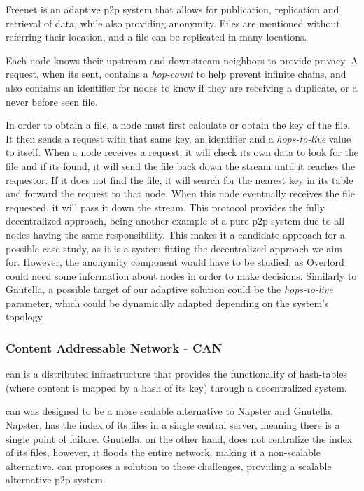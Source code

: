Freenet \cite{Clarke2001} is an adaptive \gls{p2p} system that allows for publication, replication and retrieval of data, while also providing anonymity. Files are mentioned without referring their location, and a file can be replicated in many locations.

Each node knows their upstream and downstream neighbors to provide privacy. A request, when its sent, contains a \textit{hop-count} to help prevent infinite chains, and also contains an identifier for nodes to know if they are receiving a duplicate, or a never before seen file.

In order to obtain a file, a node must first calculate or obtain the key of the file. It then sends a request with that same key, an identifier and a \textit{hops-to-live} value to itself. When a node receives a request, it will check its own data to look for the file and if its found, it will send the file back down the stream until it reaches the requestor. If it does not find the file, it will search for the nearest key in its table and forward the request to that node. When this node eventually receives the file requested, it will pass it down the stream. This protocol provides the fully decentralized approach, being another example of a pure \gls{p2p} system due to all nodes having the same responsibility. This makes it a candidate approach for a possible case study, as it is a system fitting the decentralized approach we aim for. However, the anonymity component would have to be studied, as Overlord could need some information about nodes in order to make decisions. Similarly to Gnutella, a possible target of our adaptive solution could be the \textit{hops-to-live} parameter, which could be dynamically adapted depending on the system's topology.

\subsubsection{Content Addressable Network - CAN}
\label{sssec:can}

\gls{can} \cite{Ratnasamy2001} is a distributed infrastructure that provides the functionality of hash-tables (where content is mapped by a hash of its key) through a decentralized system.

\gls{can} was designed to be a more scalable alternative to Napster\cite{Napster1999} and Gnutella. Napster, has the index of its files in a single central server, meaning there is a single point of failure. Gnutella, on the other hand, does not centralize the index of its files, however, it floods the entire network, making it a non-scalable alternative. \gls{can} proposes a solution to these challenges, providing a scalable alternative \gls{p2p} system.

